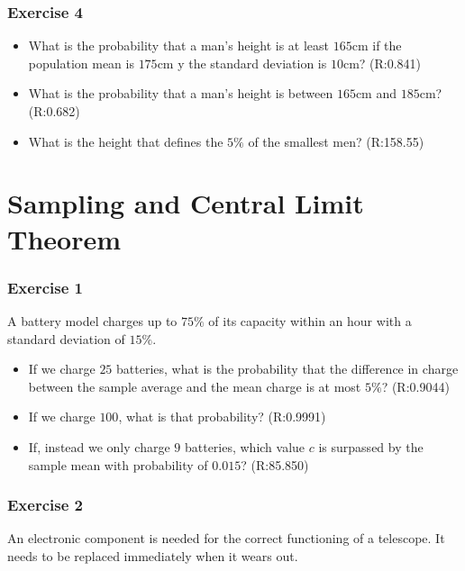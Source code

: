 \documentclass[
]{book}
\begin{document}
\hypertarget{exercise-4-2}{%
\subsubsection{Exercise 4}\label{exercise-4-2}}

\begin{itemize}
\item
  What is the probability that a man's height is at least
  \(165\)cm if the population mean is \(175\)cm y the standard deviation is \(10\)cm? (R:0.841)
\item
  What is the probability that a man's height is between
  \(165\)cm and \(185\)cm? (R:0.682)
\item
  What is the height that defines the \(5\%\) of the smallest men? (R:158.55)
\end{itemize}

\hypertarget{sampling-and-central-limit-theorem}{%
\section{Sampling and Central Limit Theorem}\label{sampling-and-central-limit-theorem}}

\hypertarget{exercise-1-5}{%
\subsubsection{Exercise 1}\label{exercise-1-5}}

A battery model charges up to \(75\%\) of its capacity within an hour with a standard deviation of \(15\%\).

\begin{itemize}
\item
  If we charge \(25\) batteries, what is the probability that the difference in charge between the sample average and the mean charge is at most \(5\%\)? (R:0.9044)
\item
  If we charge \(100\), what is that probability? (R:0.9991)
\item
  If, instead we only charge \(9\) batteries, which value \(c\) is surpassed by the sample mean with probability of \(0.015\)? (R:85.850)
\end{itemize}

\hypertarget{exercise-2-5}{%
\subsubsection{Exercise 2}\label{exercise-2-5}}

An electronic component is needed for the correct functioning of a telescope. It needs to be replaced immediately when it wears out.
\end{document}

